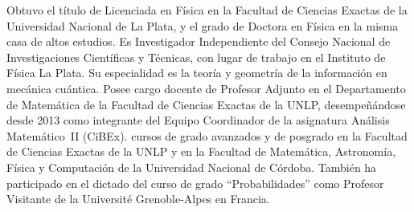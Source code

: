 Obtuvo el t\'itulo de Licenciada en  F\'isica en la Facultad de Ciencias Exactas
de la Universidad Nacional de La Plata,  y el grado de Doctora en F\'isica en la
misma casa de altos estudios. Es Investigador Independiente del Consejo Nacional
de  Investigaciones Cient\'ificas  y  T\'ecnicas,  con lugar  de  trabajo en  el
Instituto de F\'isica La Plata. Su  especialidad es la teor\'ia y geometr\'ia de
la  informaci\'on en  mec\'anica  cu\'antica. Posee  cargo  docente de  Profesor
Adjunto en el Departamento de Matem\'atica de la Facultad de Ciencias Exactas de
la UNLP, desempe\~n\'andose desde 2013 como integrante del Equipo Coordinador de
la asignatura An\'alisis Matem\'atico~II (CiBEx).
cursos de grado avanzados y de posgrado en la Facultad de Ciencias Exactas de la
UNLP y en la Facultad de Matem\'atica, Astronom\'ia, F\'isica y Computaci\'on de
la Universidad  Nacional de C\'ordoba.   Tambi\'en ha participado en  el dictado
del curso de grado ``Probabilidades'' como Profesor Visitante de la Universit\'e
Grenoble-Alpes en Francia.

